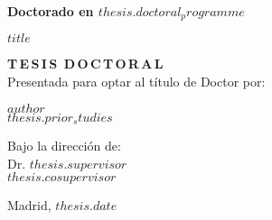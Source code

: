 \vspace{15 mm}

\begin{center}
\begin{spacing}{1.5}
\textbf{\large {Doctorado en {$thesis.doctoral_programme$}}}\\
\end{spacing}
\vspace{10 mm}

\begin{spacing}{2.0}
\textbf{\LARGE {$title$}}
\end{spacing}

\vspace{15 mm}

\begin{spacing}{1.3}
\textbf{\LARGE {T\,E\,S\,I\,S\, D\,O\,C\,T\,O\,R\,A\,L}}\\
\medskip
{\large {Presentada para optar al título de Doctor por:}}
\end{spacing}
\end{center}


\begin{center}
\begin{spacing}{1.3}
\textbf{\Large {$author$}}\\
{\large {$thesis.prior_studies$}}\\
\end{spacing}
\end{center}

\vspace{5 mm}
\begin{center}
\begin{spacing}{1.3}
{Bajo la dirección de:}\\
    {\large {Dr. $thesis.supervisor$}}\\
    {\large {$thesis.cosupervisor$}}
\end{spacing}
\end{center}

\vspace{\fill}
\begin{center}
    \large {Madrid, $thesis.date$}
\end{center}

\newpage
